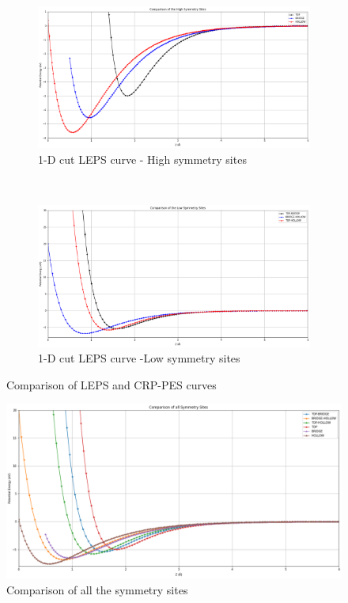 \documentclass[12pt]{article}
\begin{document}
\begin{figure}[h!]
    \centering
    \begin{subfigure}[t]{0.5\textwidth}
        \centering
    \includegraphics[scale = 0.2]{comprisonhigh.png}
      \caption{1-D cut LEPS curve - High symmetry sites} 
    \label{fig:12}
    \end{subfigure}%
    ~ 
    \begin{subfigure}[t]{0.5\textwidth}
        \centering
    \includegraphics[scale = 0.2]{comparisonlow.png}
    \caption{1-D cut LEPS curve -Low symmetry sites} 
    \label{fig:13}
    \end{subfigure}
    \caption{Comparison of LEPS and CRP-PES curves}
\end{figure}
    
\begin{figure}[h!]
    \centering
    \includegraphics[scale = 0.28]{comparison.png}
      \caption{Comparison of all the symmetry sites} 
    \label{fig:14}
\end{figure}  
\end{document}
